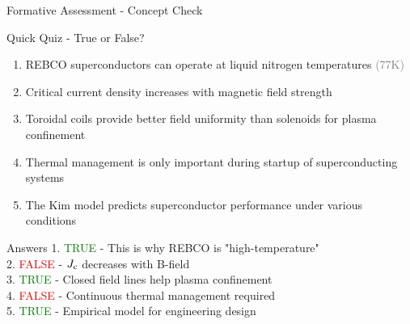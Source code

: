 \begin{frame}{Formative Assessment - Concept Check}
    \begin{block}{Quick Quiz - True or False?}
        \begin{enumerate}
            \item REBCO superconductors can operate at liquid nitrogen temperatures \textcolor{gray}{(77K)}
            \item Critical current density increases with magnetic field strength
            \item Toroidal coils provide better field uniformity than solenoids for plasma confinement
            \item Thermal management is only important during startup of superconducting systems
            \item The Kim model predicts superconductor performance under various conditions
        \end{enumerate}
    \end{block}
    
    \pause
    \begin{alertblock}{Answers}
        1. \textcolor{green}{TRUE} - This is why REBCO is "high-temperature" \\
        2. \textcolor{red}{FALSE} - $J_\text{c}$ decreases with B-field \\
        3. \textcolor{green}{TRUE} - Closed field lines help plasma confinement \\
        4. \textcolor{red}{FALSE} - Continuous thermal management required \\
        5. \textcolor{green}{TRUE} - Empirical model for engineering design
    \end{alertblock}
\end{frame}

